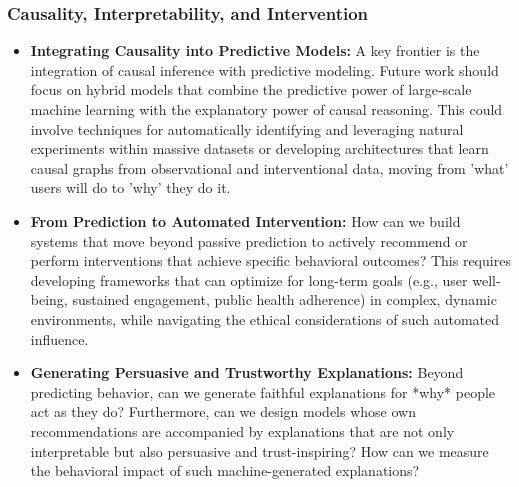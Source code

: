 \subsubsection*{Causality, Interpretability, and Intervention}
\begin{itemize}
    \item \textbf{Integrating Causality into Predictive Models:} A key frontier is the integration of causal inference with predictive modeling. Future work should focus on hybrid models that combine the predictive power of large-scale machine learning with the explanatory power of causal reasoning. This could involve techniques for automatically identifying and leveraging natural experiments within massive datasets or developing architectures that learn causal graphs from observational and interventional data, moving from 'what' users will do to 'why' they do it.
    
    \item \textbf{From Prediction to Automated Intervention:} How can we build systems that move beyond passive prediction to actively recommend or perform interventions that achieve specific behavioral outcomes? This requires developing frameworks that can optimize for long-term goals (e.g., user well-being, sustained engagement, public health adherence) in complex, dynamic environments, while navigating the ethical considerations of such automated influence.

    \item \textbf{Generating Persuasive and Trustworthy Explanations:} Beyond predicting behavior, can we generate faithful explanations for *why* people act as they do? Furthermore, can we design models whose own recommendations are accompanied by explanations that are not only interpretable but also persuasive and trust-inspiring? How can we measure the behavioral impact of such machine-generated explanations?
\end{itemize}

